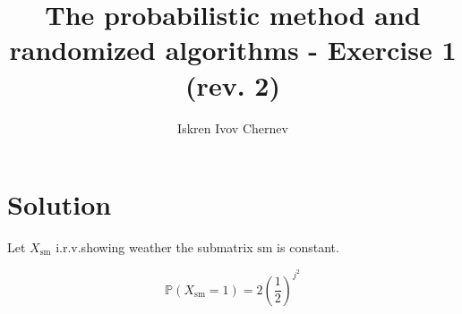 \documentclass[a4paper]{article}
\def\rbc{foo bar}
\begin{document}

% 
% 
% 

\title{The probabilistic method and randomized algorithms - Exercise 1 (rev. 2)}
\author{Iskren Ivov Chernev}
\maketitle


\section{Solution}

\def\sm{\mathrm{sm}}
\def\P{\mathbb{P}}
\def\E{\mathbb{E}}
\def\irv{i.r.v.\;}
\def\rv{r.v.\;}
\def\FMM{F.M.M.\;}
\def\endproof{$\square$}
\def\Var{\mathrm{Var}}
\newcommand{\bfrac}[2] {\left(\frac{#1}{#2}\right)}
\newcommand{\B}[1] {\left(#1\right)}

Let $ X_{\sm} $ \irv showing weather the submatrix $ \sm $ is constant.

$$
  \P(X_{\sm} = 1) = 2 \left(\frac{1}{2}\right)^{j^2}
$$
\end{document}
